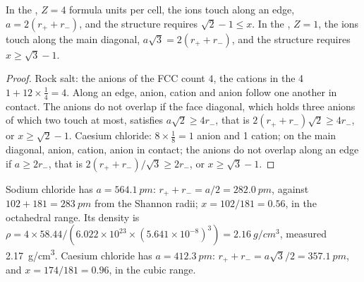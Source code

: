 \begin{proposition}\label{prop:b1:crystals-ionic-covalent:nacl-cscl}
In the , $Z = 4$ formula units per cell, the ions touch
along an edge, $a = 2(r_+ + r_-)$, and the structure requires $\sqrt2 - 1
\le x$. In the , $Z = 1$, the ions touch along the
main diagonal, $a\sqrt3 = 2(r_+ + r_-)$, and the structure requires
$x \ge \sqrt3 - 1$.
\end{proposition}

\begin{proof}
Rock salt: the anions of the FCC  count $4$, the cations in the 4
 $1 + 12 \times \frac14 = 4$. Along an edge, anion,
cation and anion follow one another in contact. The anions do not overlap
if the face diagonal, which holds three anions of which two touch at
most, satisfies $a\sqrt2 \ge 4r_-$, that is $2(r_+ + r_-)\sqrt2 \ge
4r_-$, or $x \ge \sqrt2 - 1$. Caesium chloride: $8 \times \frac18 = 1$
anion and 1 cation; on the main diagonal, anion, cation, anion in
contact; the anions do not overlap along an edge if $a \ge 2r_-$, that is
$2(r_+ + r_-)/\sqrt3 \ge 2r_-$, or $x \ge \sqrt3 - 1$.
\end{proof}

\begin{example}\label{ex:b1:crystals-ionic-covalent:nacl}
Sodium chloride has $a = \qty{564.1}{pm}$: $r_+ + r_- = a/2 =
\qty{282.0}{pm}$, against $102 + 181 = \qty{283}{pm}$ from the Shannon
radii; $x = 102/181 = 0.56$, in the octahedral range. Its density is
$\rho = 4 \times 58.44/(6.022 \times 10^{23} \times (5.641 \times
10^{-8})^3) = \qty{2.16}{g/cm^3}$, measured \qty{2.17}{g/cm^3}. Caesium
chloride has $a = \qty{412.3}{pm}$: $r_+ + r_- = a\sqrt3/2 =
\qty{357.1}{pm}$, and $x = 174/181 = 0.96$, in the cubic range.
\end{example}

